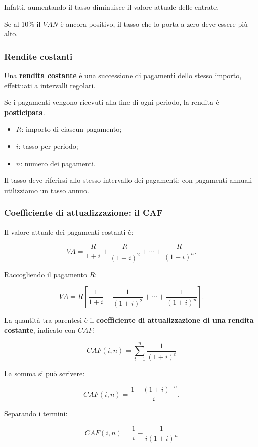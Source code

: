 \noindent Infatti,
aumentando il tasso diminuisce
il valore attuale delle entrate.

\noindent Se al 10\% il $VAN$
è ancora positivo,
il tasso che lo porta a zero
deve essere più alto.


\subsubsection*{Rendite costanti}

\noindent Una \textbf{rendita costante}
è una successione di pagamenti
dello stesso importo,
effettuati a intervalli regolari.

\noindent Se i pagamenti vengono ricevuti
alla fine di ogni periodo,
la rendita è \textbf{posticipata}.

\begin{itemize}
    \item $R$: importo di ciascun pagamento;
    \item $i$: tasso per periodo;
    \item $n$: numero dei pagamenti.
\end{itemize}

\noindent Il tasso deve riferirsi
allo stesso intervallo dei pagamenti:
con pagamenti annuali
utilizziamo un tasso annuo.


\subsubsection*{Coefficiente di attualizzazione:
il CAF}

\noindent Il valore attuale
dei pagamenti costanti è:

\[
VA=
\frac{R}{1+i}
+
\frac{R}{(1+i)^2}
+
\cdots
+
\frac{R}{(1+i)^n}.
\]

\noindent Raccogliendo il pagamento $R$:

\[
VA=
R\left[
\frac{1}{1+i}
+
\frac{1}{(1+i)^2}
+
\cdots
+
\frac{1}{(1+i)^n}
\right].
\]

\noindent La quantità tra parentesi
è il \textbf{coefficiente di attualizzazione
di una rendita costante},
indicato con $CAF$:

\[
\boxed{
CAF(i,n)
=
\sum_{t=1}^{n}\frac{1}{(1+i)^t}
}
\]

\noindent La somma si può scrivere:

\[
CAF(i,n)
=
\frac{1-(1+i)^{-n}}{i}.
\]

\noindent Separando i termini:

\[
\boxed{
CAF(i,n)
=
\frac{1}{i}
-
\frac{1}{i(1+i)^n}
}
\]


